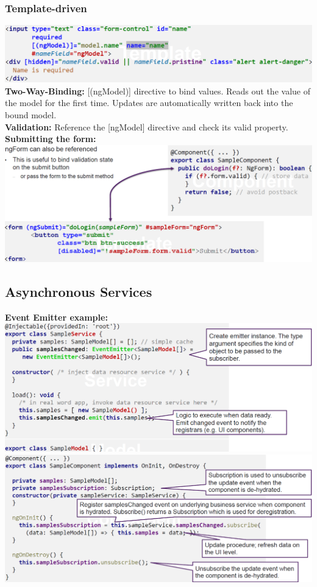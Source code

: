 \subsubsection{Template-driven}
\includegraphics[width=\linewidth]{img/angular_forms.png}
\textbf{Two-Way-Binding:} [(ngModel)] directive to bind values.
Reads out the value of the model for the first time.
Updates are automatically written back into the bound model.\\
\textbf{Validation:} Reference the [ngModel] directive and check its valid property.\\
\textbf{Submitting the form:}\\
\includegraphics[width=0.8\linewidth]{img/angular_forms_submit.png}


\subsection{Asynchronous Services}
\textbf{Event Emitter example:}\\
\includegraphics[width=\linewidth]{img/angular_asynchronous_services.png}
\includegraphics[width=\linewidth]{img/angular_asynchronous_services2.png}

